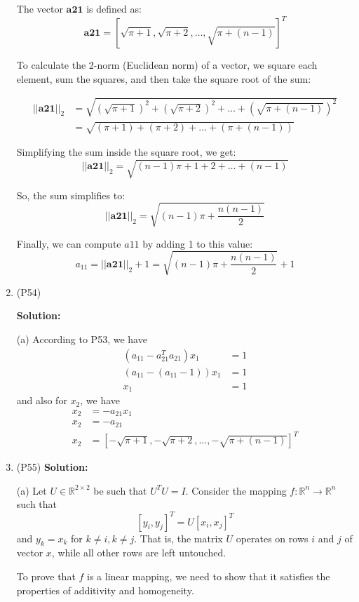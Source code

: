 \documentclass{article}
\begin{document}
\begin{enumerate}[leftmargin=\labelsep]
The vector $\mathbf{a21}$ is defined as:
\[
\mathbf{a21} = \left[ \sqrt{\pi + 1}, \sqrt{\pi + 2}, \ldots, \sqrt{\pi + (n - 1)} \right]^T
\]

To calculate the 2-norm (Euclidean norm) of a vector, we square each element, sum the squares, and then take the square root of the sum:

\[
\begin{aligned}
||\mathbf{a21}||_2 &= \sqrt{\left( \sqrt{\pi + 1} \right)^2 + \left( \sqrt{\pi + 2} \right)^2 + \ldots + \left( \sqrt{\pi + (n - 1)} \right)^2} \\
&= \sqrt{(\pi + 1) + (\pi + 2) + \ldots + (\pi + (n - 1))}
\end{aligned}
\]

Simplifying the sum inside the square root, we get:
\[
||\mathbf{a21}||_2 = \sqrt{(n-1)\pi + 1 + 2 + \ldots + (n - 1)}
\]

So, the sum simplifies to:
\[
||\mathbf{a21}||_2 = \sqrt{(n-1)\pi + \frac{n(n - 1)}{2}}
\]

Finally, we can compute $a11$ by adding 1 to this value:
\[
a_{11} = ||\mathbf{a21}||_2 + 1 = \sqrt{(n-1)\pi + \frac{n(n - 1)}{2}} + 1
\]
\item (P54)

\textbf{Solution:}

(a) According to P53, we have
\begin{align}
	(a_{11}-a_{21}^Ta_{21})x_1 &= 1\\
	(a_{11}-(a_{11} - 1))x_1 &= 1\\
	x_1 &= 1
\end{align}
and also for $x_2$, we have
\begin{align}
	x_2 &= -a_{21}x_1\\
	x_2 &= -a_{21}\\
	x_2 &= \left[ -\sqrt{\pi + 1}, -\sqrt{\pi + 2}, \ldots, -\sqrt{\pi + (n - 1)} \right]^T
\end{align}
\item (P55)
\textbf{Solution: }

(a) Let $U \in \mathbb{R}^{2 \times 2}$ be such that $U^TU = I$. Consider the mapping $f : \mathbb{R}^n \rightarrow \mathbb{R}^n$ such that
\[
[y_i, y_j]^T = U[x_i, x_j]^T
\]
and $y_k = x_k$ for $k \neq i, k \neq j$. That is, the matrix $U$ operates on rows $i$ and $j$ of vector $x$, while all other rows are left untouched.

To prove that $f$ is a linear mapping, we need to show that it satisfies the properties of additivity and homogeneity.


\end{enumerate}
\end{document}
